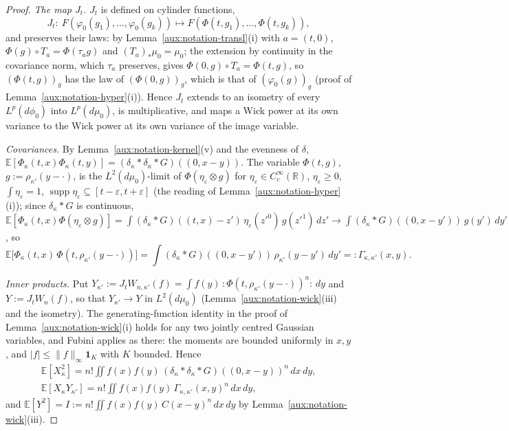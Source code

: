 \documentclass[11pt,a4paper]{article}
\theoremstyle{plain}
\theoremstyle{definition}
\theoremstyle{plain}
\theoremstyle{definition}
\newcommand{\R}{\mathbb{R}}
\newcommand{\E}{\mathbb{E}}
\DeclareMathOperator{\supp}{supp}
\newcommand{\dmu}{d\mu_0}
\newcommand{\dphi}{d\phi_0}
\begin{document}
\begin{proof}
\emph{The map $J_t$.}  $J_t$ is defined on cylinder functions,
\[
 J_t:\ F(\varphi_0(g_1),\dots,\varphi_0(g_k))\longmapsto F(\Phi(t,g_1),\dots,\Phi(t,g_k)),
\]
and preserves their laws: by Lemma~\ref{aux:notation-transl}(i) with $a=(t,0)$, $\Phi(g)\circ T_a=\Phi(\tau_ag)$
and $(T_a)_*\mu_0=\mu_0$; the extension by continuity in the covariance norm, which $\tau_a$
preserves, gives $\Phi(0,g)\circ T_a=\Phi(t,g)$, so $(\Phi(t,g))_g$ has the law of $(\Phi(0,g))_g$,
which is that of $(\varphi_0(g))_g$ (proof of Lemma~\ref{aux:notation-hyper}(i)).  Hence $J_t$
extends to an isometry of every $L^p(\dphi)$ into $L^p(\dmu)$, is multiplicative, and maps a Wick
power at its own variance to the Wick power at its own variance of the image variable.

\emph{Covariances.}  By Lemma~\ref{aux:notation-kernel}(v) and the evenness of $\delta$,
$\E[\Phi_\kappa(t,x)\Phi_\kappa(t,y)]=(\delta_\kappa*\delta_\kappa*G)((0,x-y))$.  The variable
$\Phi(t,g)$, $g:=\rho_{\kappa'}(y-\cdot)$, is the $L^2(\dmu)$-limit of $\Phi(\eta_\varepsilon\otimes
g)$ for $\eta_\varepsilon\in C_c^\infty(\R)$, $\eta_\varepsilon\ge0$, $\int\eta_\varepsilon=1$,
$\supp\eta_\varepsilon\subseteq[t-\varepsilon,t+\varepsilon]$ (the reading of
Lemma~\ref{aux:notation-hyper}(i)); since $\delta_\kappa*G$ is continuous,
$\E[\Phi_\kappa(t,x)\Phi(\eta_\varepsilon\otimes g)]=\int(\delta_\kappa*G)((t,x)-z')\,
\eta_\varepsilon(z'^0)\,g(z'^1)\,dz'\to\int(\delta_\kappa*G)((0,x-y'))\,g(y')\,dy'$, so
\[
 \E\bigl[\Phi_\kappa(t,x)\,\Phi(t,\rho_{\kappa'}(y-\cdot))\bigr]
 =\int(\delta_\kappa*G)((0,x-y'))\,\rho_{\kappa'}(y-y')\,dy'=:\Gamma_{\kappa,\kappa'}(x,y) .
\]

\emph{Inner products.}  Put $Y_{\kappa'}:=J_tW_{n,\kappa'}(f)=\int f(y)\,{:}\Phi(t,\rho_{\kappa'}
(y-\cdot))^n{:}\,dy$ and $Y:=J_tW_n(f)$, so that $Y_{\kappa'}\to Y$ in $L^2(\dmu)$
(Lemma~\ref{aux:notation-wick}(iii) and the isometry).  The generating-function identity in the
proof of Lemma~\ref{aux:notation-wick}(i) holds for any two jointly centred Gaussian variables, and
Fubini applies as there: the moments are bounded uniformly in $x,y$, and $|f|\le\|f\|_\infty
\mathbf 1_K$ with $K$ bounded.  Hence
\begin{gather*}
 \E[X_\kappa^2]=n!\iint f(x)f(y)\,(\delta_\kappa*\delta_\kappa*G)((0,x-y))^n\,dx\,dy,\\
 \E[X_\kappa Y_{\kappa'}]=n!\iint f(x)f(y)\,\Gamma_{\kappa,\kappa'}(x,y)^n\,dx\,dy ,
\end{gather*}
and $\E[Y^2]=I:=n!\iint f(x)f(y)\,C(x-y)^n\,dx\,dy$ by Lemma~\ref{aux:notation-wick}(iii).


\end{proof}
\end{document}
